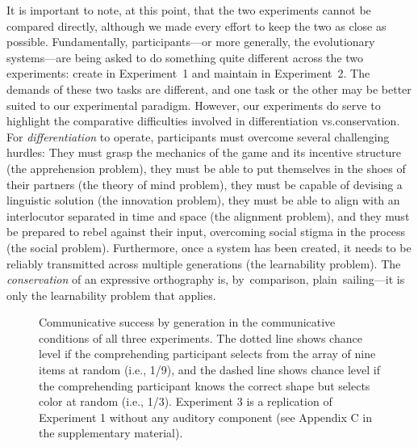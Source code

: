 \documentclass[doc,biblatex]{apa7}
\begin{document}
It is important to note, at this point, that the two experiments cannot be compared directly, although we made every effort to keep the two as close as possible. Fundamentally, participants---or more generally, the evolutionary systems---are being asked to do something quite different across the two experiments: create in Experiment~1 and maintain in Experiment~2. The demands of these two tasks are different, and one task or the other may be better suited to our experimental paradigm. However, our experiments do serve to highlight the comparative difficulties involved in differentiation vs.\@ conservation. For \textit{differentiation} to operate, participants must overcome several challenging hurdles: They must grasp the mechanics of the game and its incentive structure (the apprehension problem), they must be able to put themselves in the shoes of their partners (the theory of mind problem), they must be capable of devising a linguistic solution (the innovation problem), they must be able to align with an interlocutor separated in time and space (the alignment problem), and they must be prepared to rebel against their input, overcoming social stigma in the process (the social problem). Furthermore, once a system has been created, it needs to be reliably transmitted across multiple generations (the learnability problem). The \textit{conservation} of an expressive orthography is, by~comparison, plain~sailing---it is only the learnability problem that applies.

	\begin{figure}
	\vspace*{2pt}
	\caption{Communicative success by generation in the communicative conditions of all three experiments. The dotted line shows chance level if the comprehending participant selects from the array of nine items at random (i.e., 1/9), and the dashed line shows chance level if the comprehending participant knows the correct shape but selects color at random (i.e., 1/3). Experiment 3 is a replication of Experiment 1 without any auditory component (see Appendix C in the supplementary material).}
	\label{fig12}
	\end{figure}
\end{document}
